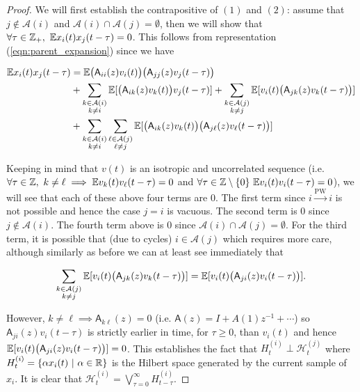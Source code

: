 \documentclass[12pt]{article}
\def\pwgc{\overset{\text{PW}}{\rightarrow}}  %
\def\A{\mathsf{A}}  %
\def\H{\mathcal{H}}  %
\newcommand{\anc}[1]{\mathcal{A}(#1)}  %
\begin{document}
\begin{proof}
  We will first establish the contrapositive of $(1)$ and $(2)$: assume that $j \not \in \anc{i}$ and $\anc{i} \cap \anc{j} = \emptyset$, then we will show that $\forall \tau \in \mathbb{Z}_+,\ \mathbb{E} x_i(t)x_j(t - \tau) = 0$.  This follows from representation (\ref{eqn:parent_expansion}) since we have

  \begin{align*}
    \E x_i(t)x_j(t - \tau) &= \E \big(\A_{ii}(z)v_i(t)\big)\big(\A_{jj}(z)v_j(t - \tau)\big)\\
    &+ \sum_{\substack{k \in \anc{i} \\ k \ne i}}\E[\big(\A_{ik}(z)v_k(t)\big)v_j(t - \tau)] + \sum_{\substack{k \in \anc{j} \\ k \ne j}}\E[v_i(t) \big(\A_{jk}(z) v_k(t - \tau)\big)]\\
    &+ \sum_{\substack{k \in \anc{i} \\ k \ne i}}\sum_{\substack{\ell \in \anc{j} \\ \ell \ne j}}\E[\big(\A_{ik}(z)v_k(t)\big)\big(\A_{j\ell}(z)v_\ell(t - \tau)\big)]\\
  \end{align*}

  Keeping in mind that $v(t)$ is an isotropic and uncorrelated sequence (i.e. $\forall \tau \in \mathbb{Z},\ k \ne \ell \implies \mathbb{E} v_k(t)v_\ell(t - \tau) = 0$ and $\forall \tau \in \mathbb{Z}\setminus\{0\}\ \mathbb{E} v_i(t)v_i(t - \tau) = 0$), we will see that each of these above four terms are 0.  The first term since $i \pwgc i$ is not possible and hence the case $j = i$ is vacuous.  The second term is 0 since $j \not\in \anc{i}$.  The fourth term above is 0 since $\anc{i} \cap \anc{j} = \emptyset$.  For the third term, it is possible that (due to cycles) $i \in \anc{j}$ which requires more care, although similarly as before we can at least see immediately that

  \begin{equation*}
    \sum_{\substack{k \in \anc{j} \\ k \ne j}}\E[v_i(t) \big(\A_{jk}(z) v_k(t - \tau)\big)] = \E[v_i(t)\big(\A_{ji}(z)v_i(t - \tau)\big)].
  \end{equation*}

  However, $k \ne \ell \implies \A_{k\ell}(z) = 0$ (i.e. $\A(z) = I + A(1)z^{-1} + \cdots$) so $\A_{ji}(z)v_i(t - \tau)$ is strictly earlier in time, for $\tau \ge 0$, than $v_i(t)$ and hence $\E[v_i(t)\big(\A_{ji}(z)v_i(t - \tau)\big)] = 0$.  This establishes the fact that $H_t^{(i)} \perp \H_t^{(j)}$ where $H_t^{(i)} = \{\alpha x_i(t)\ |\ \alpha \in \mathbb{R}\}$ is the Hilbert space generated by the current sample of $x_i$.  It is clear that $\H_t^{(i)} = \bigvee_{\tau = 0}^\infty H_{t - \tau}^{(i)}$.


\end{proof}
\end{document}
